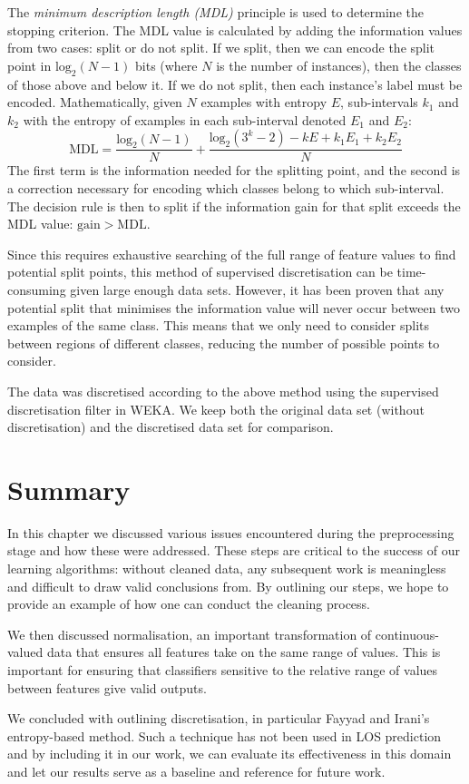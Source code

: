 The \textit{minimum description length (MDL)} principle is used to determine
the stopping criterion. The MDL value is calculated by adding the information
values from two cases: split or do not split. If we split, then we can encode
the split point in $\mathrm{log}_2(N-1)$ bits (where $N$ is the number of
instances), then the classes of those above and below it. If we do not split,
then each instance's label must be encoded. Mathematically, given $N$ examples
with entropy $E$, sub-intervals $k_1$ and $k_2$ with the entropy of examples
in each sub-interval denoted $E_1$ and $E_2$:
\begin{equation*}
\mathrm{MDL} = \dfrac{\mathrm{log}_2(N-1)}{N} + \dfrac{\mathrm{log}_2(3^k-2) - kE + k_1E_1 + k_2E_2}{N}
\end{equation*}
The first term is the information needed for the splitting point, and the
second is a correction necessary for encoding which classes belong to which
sub-interval. The decision rule is then to split if the information gain for
that split exceeds the MDL value: $\mathrm{gain} > \mathrm{MDL}$.

Since this requires exhaustive searching of the full range of feature values
to find potential split points, this method of supervised discretisation can
be time-consuming given large enough data sets. However, it has been proven
that any potential split that minimises the information value will never occur
between two examples of the same class. This means that we only need to
consider splits between regions of different classes, reducing the number of
possible points to consider.

The data was discretised according to the above method using the supervised
discretisation filter in WEKA. We keep both the original data set (without
discretisation) and the discretised data set for comparison.

\section{Summary}
In this chapter we discussed various issues encountered during the
preprocessing stage and how these were addressed. These steps are critical to
the success of our learning algorithms: without cleaned data, any subsequent
work is meaningless and difficult to draw valid conclusions from. By outlining
our steps, we hope to provide an example of how one can conduct the cleaning
process.

We then discussed normalisation, an important transformation of
continuous-valued data that ensures all features take on the same range of
values. This is important for ensuring that classifiers sensitive to the
relative range of values between features give valid outputs.

We concluded with outlining discretisation, in particular Fayyad and Irani's
entropy-based method. Such a technique has not been used in LOS prediction
and by including it in our work, we can evaluate its effectiveness in this
domain and let our results serve as a baseline and reference for future work.
